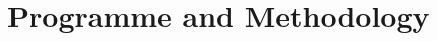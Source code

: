 \documentclass[twocolumn,a4paper,11pt]{article}
\begin{document}







\section{Programme and Methodology}
\end{document}
